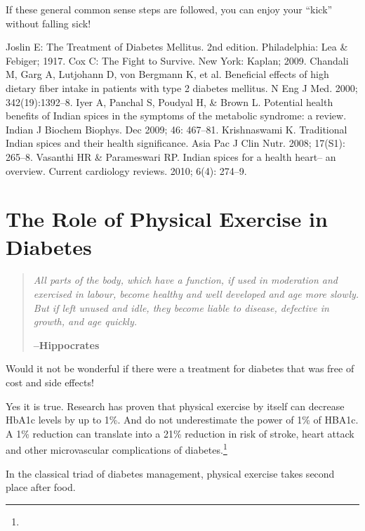 If these general common sense steps are followed, you can enjoy your “kick” without falling sick!

\begin{thebibliography}{99}
 Joslin E: The Treatment of Diabetes Mellitus. 2nd edition. Philadelphia: Lea \& Febiger; 1917.
 Cox C: The Fight to Survive. New York: Kaplan; 2009.
 Chandali M, Garg A, Lutjohann D, von Bergmann K, et al. Beneficial effects of high dietary fiber intake in patients with type 2 diabetes mellitus. N Eng J Med. 2000; 342(19):1392–8.
 Iyer A, Panchal S, Poudyal H, \& Brown L. Potential health benefits of Indian spices in the symptoms of the metabolic syndrome: a review. Indian J Biochem Biophys. Dec 2009; 46: 467–81.
 Krishnaswami K. Traditional Indian spices and their health significance. Asia Pac J Clin Nutr. 2008; 17(S1): 265–8.
 Vasanthi HR \& Parameswari RP. Indian spices for a health heart– an overview. Current cardiology reviews. 2010; 6(4): 274–9.
\end{thebibliography}


\chapter{The Role of Physical Exercise in Diabetes}\label{chap23}

\begin{quote}
\textit{All parts of the body, which have a function, if used in moderation and exercised in labour, become healthy and well developed and age more slowly. But if left unused and idle, they become liable to disease, defective in growth, and age quickly.} 
\begin{flushright}
\textbf{–Hippocrates}
\end{flushright}
\end{quote}

Would it not be wonderful if there were a treatment for diabetes that was free of cost and side effects!

Yes it is true. Research has proven that physical exercise by itself can decrease HbA1c levels by up to 1\%. And do not underestimate the power of 1\% of HBA1c. A 1\% reduction can translate into a 21\% reduction in risk of stroke, heart attack and other microvascular complications of diabetes.\footnote{}

In the classical triad of diabetes management, physical exercise takes second place after food.

